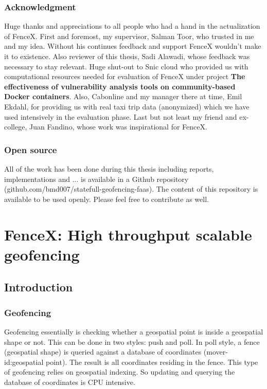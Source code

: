 \documentclass[a4]{report}
\begin{document}
        \section{Acknowledgment}
        Huge thanks and appreciations to all people who had a hand in the actualization of FenceX.
        First and foremost, my supervisor, Salman Toor, who trusted in me and my idea.
        Without his continues feedback and support FenceX wouldn't make it to existence.
        Also reviewer of this thesis, Sadi Alawadi, whose feedback was necessary to stay relevant.
        Huge shut-out to Snic cloud who provided us with computational resources needed for evaluation of FenceX under
        project \textbf{The effectiveness of vulnerability analysis tools on community-based Docker containers}.
        Also, Cabonline and my manager there at time,  Emil Ekdahl, for providing us with real taxi trip data
        (anonymized) which we have used intensively in the evaluation phase.
        Last but not least my friend and ex-college, Juan Fandino, whose work was inspirational for FenceX.

        \section{Open source}
        All of the work has been done during this thesis including reports, implementations and ... is available in
        a Github repository (github.com/bmd007/statefull-geofencing-faas).
        The content of this repository is available to be used openly.
        Please feel free to contribute as well.

        \part[FenceX]{FenceX: High throughput scalable geofencing}

        \chapter{Introduction}

        \section{Geofencing}
        Geofencing essentially is checking whether a geospatial point is inside a geospatial shape or not.
        This can be done in two styles: push and poll.
        In poll style, a fence (geospatial shape) is queried against a database of coordinates (mover-id:geospatial point).
        The result is all coordinates residing in the fence.
        This type of geofencing relies on geospatial indexing.
        So updating and querying the database of coordinates is CPU intensive.
\end{document}
